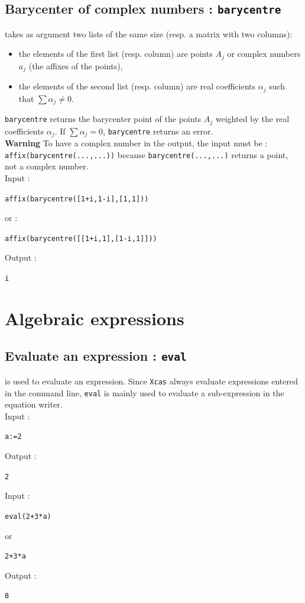 \documentclass[a4paper,11pt]{book}
\begin{document}
\subsection{Barycenter of complex numbers : {\tt barycentre}}\label{sec:baryc}
 takes as argument two lists of the same size
(resp. a matrix with two columns): 
\begin{itemize}
\item the elements of the first list (resp. column) 
are points $A_j$ or complex numbers $a_j$ (the affixes of the points),
\item the elements of the second list (resp. column) are real coefficients 
$\alpha_j$ such that $\sum \alpha_j \neq 0$.
\end{itemize}
{\tt barycentre} returns the barycenter point of the  points $A_j$ 
weighted by the real coefficients  $\alpha_j$.
If $\sum \alpha_j = 0$, {\tt barycentre} returns an
error.\\
{\bf Warning} To have a complex number in the output, the input must be :\\
{\tt affix(barycentre(...,...))} 
because {\tt barycentre(...,...)} returns a point, not a complex number.\\
Input :
\begin{center}{\tt affix(barycentre([1+i,1-i],[1,1]))}\end{center}
or :
\begin{center}{\tt affix(barycentre([[1+i,1],[1-i,1]]))}\end{center}
Output :
\begin{center}{\tt i}\end{center}

\section{Algebraic expressions}
\subsection{Evaluate an expression : {\tt eval}}
 is used to evaluate an expression. Since 
{\tt Xcas} always evaluate expressions entered in the command line, 
{\tt eval} is mainly used 
to evaluate a sub-expression in the equation writer.\\
Input :
\begin{center}{\tt a:=2}\end{center}
Output :
\begin{center}{\tt 2}\end{center}
Input :
\begin{center}{\tt eval(2+3*a)}\end{center}
or
\begin{center}{\tt 2+3*a}\end{center}
Output :
\begin{center}{\tt 8}\end{center}
\end{document}
